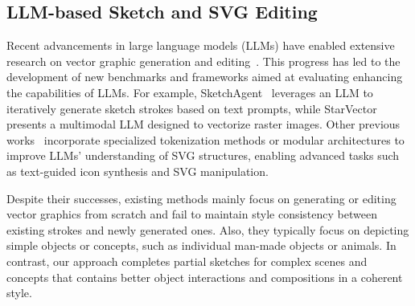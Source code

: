 \subsection{LLM-based Sketch and SVG Editing}
Recent advancements in large language models (LLMs) have enabled extensive research on vector graphic generation and editing~\cite{nishina2024svgeditbench,zou2024vgbench,cai2023leveraging}.
This progress has led to the development of new benchmarks and frameworks aimed at evaluating enhancing the capabilities of LLMs.
For example, SketchAgent~\cite{vinker2024sketchagent} leverages an LLM to iteratively generate sketch strokes based on text prompts, while StarVector~\cite{rodriguez2023starvector} presents a multimodal LLM designed to vectorize raster images.
Other previous works~\cite{wu2023iconshop,tang2024strokenuwa,xing2024empowering} incorporate specialized tokenization methods or modular architectures to improve LLMs’ understanding of SVG structures, enabling advanced tasks such as text-guided icon synthesis and SVG manipulation. 

Despite their successes, existing methods mainly focus on generating or editing vector graphics from scratch and fail to maintain style consistency between existing strokes and newly generated ones. 
Also, they typically focus on depicting simple objects or concepts, such as individual man-made objects or animals. 
In contrast, our approach completes partial sketches for complex scenes and concepts that contains better object interactions and compositions in a coherent style.